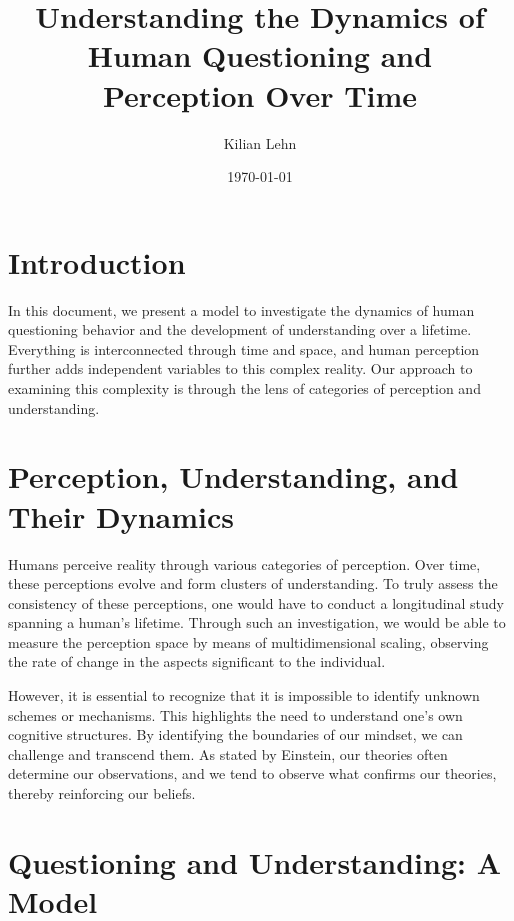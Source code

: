 \documentclass{article}
\begin{document}
    \title{Understanding the Dynamics of Human Questioning and Perception Over Time}
    \author{Kilian Lehn}
    \date{\today}
    \maketitle


    \section{Introduction}

    In this document, we present a model to investigate the dynamics of human questioning behavior and the development of understanding over a lifetime. Everything is interconnected through time and space, and human perception further adds independent variables to this complex reality. Our approach to examining this complexity is through the lens of categories of perception and understanding.


    \section{Perception, Understanding, and Their Dynamics}

    Humans perceive reality through various categories of perception. Over time, these perceptions evolve and form clusters of understanding. To truly assess the consistency of these perceptions, one would have to conduct a longitudinal study spanning a human's lifetime. Through such an investigation, we would be able to measure the perception space by means of multidimensional scaling, observing the rate of change in the aspects significant to the individual.

    However, it is essential to recognize that it is impossible to identify unknown schemes or mechanisms. This highlights the need to understand one's own cognitive structures. By identifying the boundaries of our mindset, we can challenge and transcend them. As stated by Einstein, our theories often determine our observations, and we tend to observe what confirms our theories, thereby reinforcing our beliefs.

    \clearpage


    \section{Questioning and Understanding: A Model}
\end{document}
